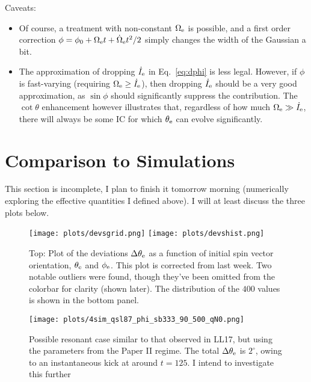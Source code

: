 \documentclass[11pt,
        usenames, %
        dvipsnames %
    ]{article}
\begin{document}
Caveats:
\begin{itemize}
    \item Of course, a treatment with non-constant $\Omega_{\rm e}$ is possible,
        and a first order correction $\phi = \phi_0 + \Omega_{\rm e}t +
        \dot{\Omega}_{\rm e}t^2/2$ simply changes the width of the Gaussian a
        bit.

    \item The approximation of dropping $\dot{I}_{\rm e}$ in Eq.~\eqref{eq:dphi}
        is less legal. However, if $\phi$ is fast-varying (requiring
        $\Omega_{\rm e} \geq \dot{I}_{\rm e}$), then dropping $\dot{I}_{\rm e}$
        should be a very good approximation, as $\sin \phi$ should significantly
        suppress the contribution. The $\cot \theta$ enhancement however
        illustrates that, regardless of how much $\Omega_{\rm e} \gg
        \dot{I}_{\rm e}$, there will always be some IC for which $\theta_{\rm
        e}$ can evolve significantly.
\end{itemize}

\section{Comparison to Simulations}

This section is incomplete, I plan to finish it tomorrow morning (numerically
exploring the effective quantities I defined above). I will at least discuss the
three plots below.
\begin{figure}
    \centering
    \texttt{[image: plots/devsgrid.png]}
    \texttt{[image: plots/devshist.png]}
    \caption{Top: Plot of the deviations $\Delta \theta_{\rm e}$ as a function
    of initial spin vector orientation, $\theta_{\rm e}$ and $\phi_{\rm e}$.
    This plot is corrected from last week. Two notable outliers were found,
    though they've been omitted from the colorbar for clarity (shown later). The
    distribution of the $400$ values is shown in the bottom
    panel.}\label{fig:devsgrid}
\end{figure}

\begin{figure}
    \centering
    \texttt{[image: plots/4sim\_qsl87\_phi\_sb333\_90\_500\_qN0.png]}
    \caption{Possible resonant case similar to that observed in LL17, but using
    the parameters from the Paper II regime. The total $\Delta \theta_{\rm e}$
    is $2^\circ$, owing to an instantaneous kick at around $t = 125$. I intend
    to investigate this further}\label{fig:kick}
\end{figure}
\end{document}
